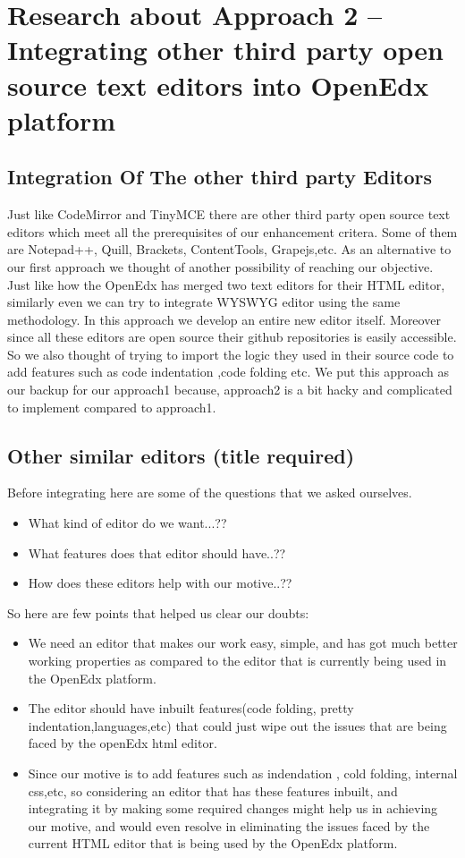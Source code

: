 \chapter{Research about Approach 2 – Integrating other third party
open source text editors into OpenEdx platform }
\section{Integration Of The other third party Editors}
Just like CodeMirror and TinyMCE there are other third party open source text editors
which meet all the prerequisites of our enhancement critera. Some of them are Notepad++,
Quill, Brackets, ContentTools, Grapejs,etc. As an alternative to our first approach we
thought of another possibility of reaching our objective. Just like how the OpenEdx has
merged two text editors for their HTML editor, similarly even we can try to integrate
WYSWYG editor using the same methodology. In this approach we develop an entire new
editor itself. Moreover since all these editors are open source their github repositories is
easily accessible. So we also thought of trying to import the logic they used in their source
code to add features such as code indentation ,code folding etc. We put this approach as our
backup for our approach1 because, approach2 is a bit hacky and complicated to implement
compared to approach1. 
\section{ Other similar editors (title required)}  
Before integrating here are some of the questions that we asked ourselves. \newline
\begin{itemize}
\item What kind of editor do we want...??
\item What features does that editor should have..??
\item How does these editors help with our motive..?? \newline 
\end{itemize}
So here are few points that helped us clear our doubts: \newline
\begin{itemize}
\item We need an editor that makes our work easy, simple, and has got much better working
properties as compared to the editor that is currently being used in the OpenEdx platform.
\item The editor should have inbuilt features(code folding, pretty indentation,languages,etc) that
could just wipe out the issues that are being faced by the openEdx html editor.
\item Since our motive is to add features such as indendation , cold folding, internal css,etc, so
considering an editor that has these features inbuilt, and integrating it by making some
required changes might help us in achieving our motive, and would even resolve in
eliminating the issues faced by the current HTML editor that is being used by the OpenEdx
platform. \newline
\end{itemize}

